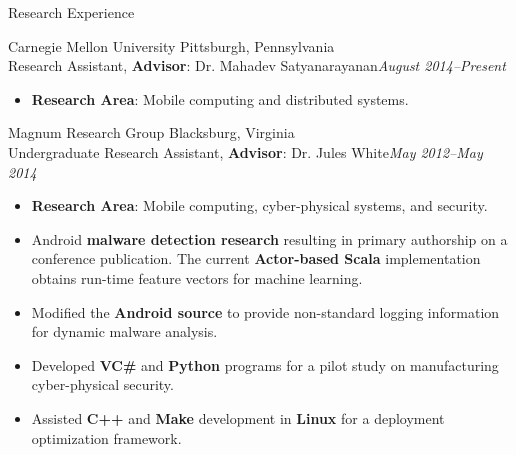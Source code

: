 \documentclass[letter]{article}
\begin{document}
\begin{minipage}{\textwidth}
{\huge Research Experience }


  
    {\large Carnegie Mellon University } \hfill Pittsburgh, Pennsylvania \\
    Research Assistant, {\bf Advisor}: Dr. Mahadev Satyanarayanan\hfill {\it August 2014--Present}\begin{itemize}
      
        \item {\bf Research Area}: Mobile computing and distributed systems.
      
      \end{itemize}\end{minipage}
    \begin{minipage}{\textwidth}
    \bigskip
  
    {\large Magnum Research Group } \hfill Blacksburg, Virginia \\
    Undergraduate Research Assistant, {\bf Advisor}: Dr. Jules White\hfill {\it May 2012--May 2014}\begin{itemize}
      
        \item {\bf Research Area}: Mobile computing, cyber-physical systems, and security.
      
        \item Android {\bf malware detection research} resulting in primary authorship on a conference publication. The current {\bf Actor-based Scala} implementation obtains run-time feature vectors for machine learning.
      
        \item Modified the {\bf Android source} to provide non-standard logging information for dynamic malware analysis.
      
        \item Developed {\bf VC\#} and {\bf Python} programs for a pilot study on manufacturing cyber-physical security.
      
        \item Assisted {\bf C++} and {\bf Make} development in {\bf Linux} for a deployment optimization framework.
      
      \end{itemize}\end{minipage}
\end{document}
